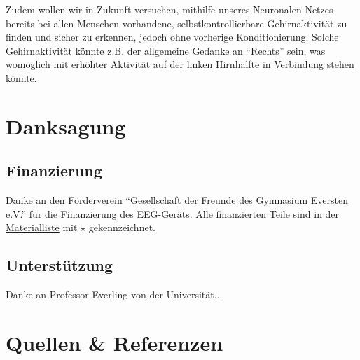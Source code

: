 \documentclass{scrartcl}
\begin{document}
	Zudem wollen wir in Zukunft versuchen, mithilfe unseres Neuronalen Netzes bereits bei allen Menschen vorhandene, selbstkontrollierbare Gehirnaktivität zu finden und sicher zu erkennen, jedoch ohne vorherige Konditionierung. Solche Gehirnaktivität könnte z.B. der allgemeine Gedanke an “Rechts” sein, was womöglich mit erhöhter Aktivität auf der linken Hirnhälfte in Verbindung stehen könnte. 

	\section{Danksagung}

	\subsection{Finanzierung} \label{Foerderverein}

	Danke an den Förderverein \enquote{Gesellschaft der Freunde des Gymnasium Eversten e.V.} für die Finanzierung des EEG-Geräts. Alle finanzierten Teile sind in der \hyperref[Materialien]{Materialliste} mit $\star$ gekennzeichnet. 

	\subsection{Unterstützung}

	Danke an Professor Everling von der Universität...

	\section{Quellen \& Referenzen}

	\printbibliography[title=Literatur, keyword=Literatur]

	\printbibliography[title=Videos, keyword=Videos]

	\printbibliography[title=Programme, keyword=Programme]
\end{document}
